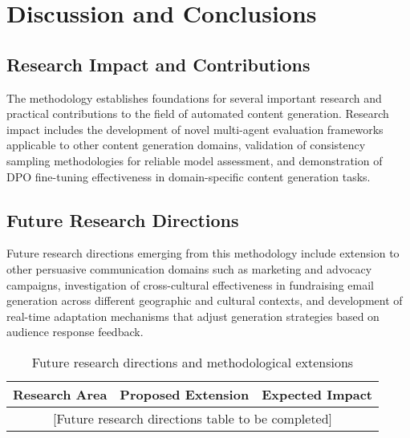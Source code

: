 \chapter{Discussion and Conclusions}
\label{sec:discussion}

\section{Research Impact and Contributions}
\label{sec:research-impact}

The methodology establishes foundations for several important research and practical contributions to the field of automated content generation. Research impact includes the development of novel multi-agent evaluation frameworks applicable to other content generation domains, validation of consistency sampling methodologies for reliable model assessment, and demonstration of DPO fine-tuning effectiveness in domain-specific content generation tasks.

\section{Future Research Directions}
\label{sec:future-directions}

Future research directions emerging from this methodology include extension to other persuasive communication domains such as marketing and advocacy campaigns, investigation of cross-cultural effectiveness in fundraising email generation across different geographic and cultural contexts, and development of real-time adaptation mechanisms that adjust generation strategies based on audience response feedback.

\begin{table}[htbp]
    \centering
    \caption{Future research directions and methodological extensions}
    \label{tab:future-research}
    \begin{tabular}{|l|l|l|}
    \hline
    \textbf{Research Area} & \textbf{Proposed Extension} & \textbf{Expected Impact} \\
    \hline
    \multicolumn{3}{|c|}{[Future research directions table to be completed]} \\
    \hline
    \end{tabular}
\end{table}

\lipsum